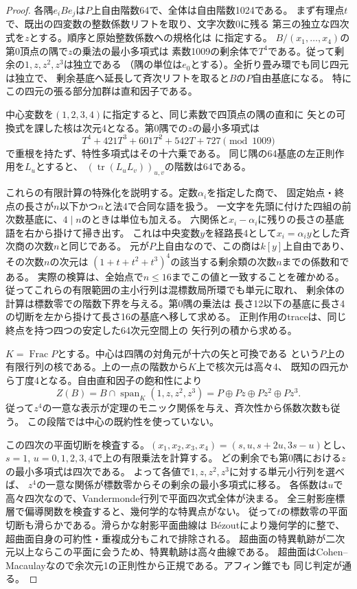 \begin{proof}
各隅$e_i B e_j$は$P$上自由階数64で、全体は自由階数1024である。
まず有理点$t$で、既出の四変数の整数係数リフトを取り、文字次数0に残る
第三の独立な四次式を$z$とする。順序と原始整数係数への規格化は
に指定する。
$B/(x_1,\ldots,x_4)$の第0頂点の隅で$z$の乗法の最小多項式は
素数1009の剰余体で$T^4$である。従って剰余の$1,z,z^2,z^3$は独立である
（隅の単位は$e_0$とする）。全折り畳み環でも同じ四元は独立で、
剰余基底へ延長して斉次リフトを取ると$B$の$P$自由基底になる。
特にこの四元の張る部分加群は直和因子である。

中心変数を$(1,2,3,4)$に指定すると、同じ素数で四頂点の隅の直和に
矢との可換式を課した核は次元4となる。第0隅での$z$の最小多項式は
\[
 T^4+421T^3+601T^2+542T+727\pmod {1009}
\]
で重根を持たず、特性多項式はその十六乗である。
同じ隅の64基底の左正則作用を$L_u$とすると、
$(\operatorname{tr}(L_uL_v))_{u,v}$の階数は64である。

これらの有限計算の特殊化を説明する。定数$\alpha_i$を指定した商で、
固定始点・終点の長さが$n$以下かつ$n$と法4で合同な語を扱う。
一文字を先頭に付けた四組の前次数基底に、$4\mid n$のときは単位も加える。
六関係と$x_i-\alpha_i$に残りの長さの基底語を右から掛けて掃き出す。
これは中央変数$y$を経路長4として$x_i=\alpha_i y$とした斉次商の次数$n$と同じである。
元が$P$上自由なので、この商は$k[y]$上自由であり、その次数$n$の次元は
$(1+t+t^2+t^3)^4$の該当する剰余類の次数$n$までの係数和である。
実際の検算は、全始点で$n\le16$までこの値と一致することを確かめる。
従ってこれらの有限範囲の主小行列は混標数局所環でも単元に取れ、
剰余体の計算は標数零での階数下界を与える。第0隅の乗法は
長さ12以下の基底に長さ4の切断を左から掛けて長さ16の基底へ移して求める。
正則作用のtraceは、同じ終点を持つ四つの安定した64次元空間上の
矢行列の積から求める。

$K=\operatorname{Frac}P$とする。中心は四隅の対角元が十六の矢と可換である
という$P$上の有限行列の核である。上の一点の階数から$K$上で核次元は高々4、
既知の四元から丁度4となる。自由直和因子の飽和性により
\[
 Z(B)=B\cap\operatorname{span}_K(1,z,z^2,z^3)
      =P\oplus Pz\oplus Pz^2\oplus Pz^3 .
\]
従って$z^4$の一意な表示が定理のモニック関係を与え、斉次性から係数次数も従う。
この段階では中心の既約性を使っていない。

この四次の平面切断を検査する。$(x_1,x_2,x_3,x_4)=(s,u,s+2u,3s-u)$とし、
$s=1$, $u=0,1,2,3,4$で上の有限乗法を計算する。
どの剰余でも第0隅における$z$の最小多項式は四次である。
よって各値で$1,z,z^2,z^3$に対する単元小行列を選べば、
$z^4$の一意な関係が標数零からその剰余の最小多項式に移る。
各係数は$u$で高々四次なので、Vandermonde行列で平面四次式全体が決まる。
全三射影座標層で偏導関数を検査すると、幾何学的な特異点がない。
従って$t$の標数零の平面切断も滑らかである。滑らかな射影平面曲線は
Bézoutにより幾何学的に整で、超曲面自身の可約性・重複成分もこれで排除される。
超曲面の特異軌跡が二次元以上ならこの平面に会うため、特異軌跡は高々曲線である。
超曲面はCohen--Macaulayなので余次元1の正則性から正規である。アフィン錐でも
同じ判定が通る。


\end{proof}
